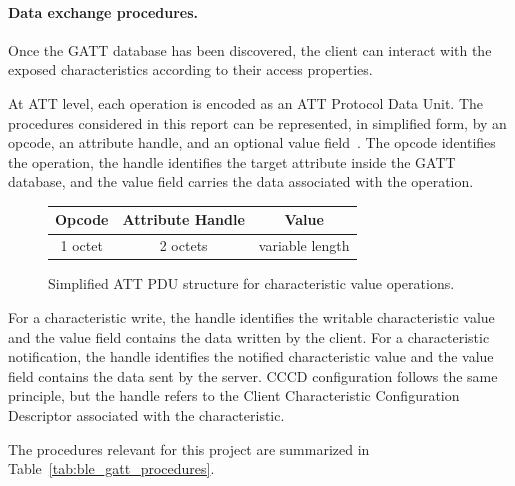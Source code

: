 \paragraph{Data exchange procedures.}
Once the GATT database has been discovered, the client can interact with the exposed characteristics according to their access properties.

At ATT level, each operation is encoded as an ATT Protocol Data Unit. 
The procedures considered in this report can be represented, in simplified form, by an opcode, an attribute handle, and an optional value field~\cite{bluetooth_core_att}. 
The opcode identifies the operation, the handle identifies the target attribute inside the GATT database, and the value field carries the data associated with the operation.

\begin{figure}[H]
	\centering
	\small
	\renewcommand{\arraystretch}{1.25}
	\begin{tabular}{|c|c|c|}
		\hline
		\textbf{Opcode} & \textbf{Attribute Handle} & \textbf{Value} \\
		\hline
		1 octet & 2 octets & variable length \\
		\hline
	\end{tabular}
	\caption{Simplified ATT PDU structure for characteristic value operations.}
	\label{fig:ble_att_pdu_format}
\end{figure}

For a characteristic write, the handle identifies the writable characteristic value and the value field contains the data written by the client. 
For a characteristic notification, the handle identifies the notified characteristic value and the value field contains the data sent by the server. 
CCCD configuration follows the same principle, but the handle refers to the Client Characteristic Configuration Descriptor associated with the characteristic.

The procedures relevant for this project are summarized in Table~\ref{tab:ble_gatt_procedures}.

